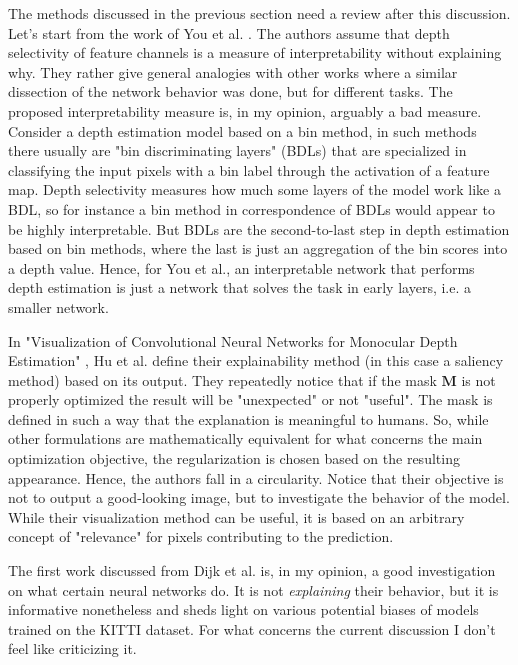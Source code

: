 \vfill

The methods discussed in the previous section need a review after this discussion.
Let's start from the work of You et al. \cite{towards_interpretable}.
The authors assume that depth selectivity of feature channels is a measure of interpretability without explaining why.
They rather give general analogies with other works where a similar dissection of the network behavior was done, but for different tasks.
The proposed interpretability measure is, in my opinion, arguably a bad measure.
Consider a depth estimation model based on a bin method, in such methods there usually are "bin discriminating layers" (BDLs) that are specialized in classifying the input pixels with a bin label through the activation of a feature map.
Depth selectivity measures how much some layers of the model work like a BDL, so for instance a bin method in correspondence of BDLs would appear to be highly interpretable.
But BDLs are the second-to-last step in depth estimation based on bin methods, where the last is just an aggregation of the bin scores into a depth value.
Hence, for You et al., an interpretable network that performs depth estimation is just a network that solves the task in early layers, i.e. a smaller network.

In "Visualization of Convolutional Neural Networks for Monocular Depth Estimation" \cite{Hu}, Hu et al. define their explainability method (in this case a saliency method) based on its output.
They repeatedly notice that if the mask $\textbf{M}$ is not properly optimized the result will be "unexpected" or not "useful".
The mask is defined in such a way that the explanation is meaningful to humans.
So, while other formulations are mathematically equivalent for what concerns the main optimization objective, the regularization is chosen based on the resulting appearance.
Hence, the authors fall in a circularity.
Notice that their objective is not to output a good-looking image, but to investigate the behavior of the model.
While their visualization method can be useful, it is based on an arbitrary concept of "relevance" for pixels contributing to the prediction.

The first work discussed from Dijk et al. \cite{Dijk} is, in my opinion, a good investigation on what certain neural networks do.
It is not \textit{explaining} their behavior, but it is informative nonetheless and sheds light on various potential biases of models trained on the KITTI dataset.
For what concerns the current discussion I don't feel like criticizing it.

